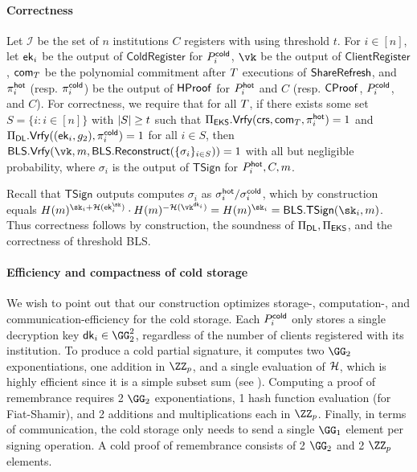 \paragraph{Correctness}
Let $\mathcal{I}$ be the set of $n$ institutions $C$ registers with using threshold $t$. For $i \in [n]$, let $\mathsf{ek}_i$ be the output of $\mathsf{ColdRegister}$ for $P_i^{\mathsf{cold}}$, $\vk$ be the output of $\mathsf{ClientRegister}$, $\mathsf{com}_{T}$ be the polynomial commitment after $T$ executions of $\mathsf{ShareRefresh}$, and $\pi_i^{\mathsf{hot}}$ (resp. $\pi_i^{\mathsf{cold}}$) be the output of $\mathsf{HProof}$ for $P_i^{\mathsf{hot}}$ and $C$ (resp. $\mathsf{CProof}$, $P_i^{\mathsf{cold}}$, and $C$).
For correctness, we require that for all $T$, if there exists some set $S = \{i: i \in [n]\}$ with $\lvert S \rvert \geq t$ such that $\Pi_{\sf EKS}.\mathsf{Vrfy}(\mathsf{crs}, \mathsf{com}_{T},\allowbreak \pi_i^{\mathsf{hot}}) = 1$ and $\Pi_{\sf DL}.\mathsf{Vrfy}((\mathsf{ek}_i, g_2), \pi_i^{\mathsf{cold}}) = 1$ for all $i \in S$,
then $\mathsf{BLS}.\vrfy(\vk,\allowbreak m, \mathsf{BLS}.\recon(\{\sigma_i\}_{i \in S})) = 1$ with all but negligible probability, where $\sigma_i$ is the output of $\mathsf{TSign}$ for $P_i^{\mathsf{hot}}, C, m$.

Recall that $\mathsf{TSign}$ outputs computes $\sigma_i$ as $\sigma_i^{\mathsf{hot}}/\sigma_i^{\mathsf{cold}}$, which by construction equals $\blshash(m)^{\sk_i + \lhlhash(\ek_i^{\sk})} \cdot \blshash(m)^{-\lhlhash(\vk^{\dk_i})} = \blshash(m)^{\sk_i} = \mathsf{BLS}.\mathsf{TSign}(\sk_i, m)$. Thus correctness follows by construction, the soundness of $\Pi_{\sf DL}, \Pi_{\sf EKS}$, and the correctness of threshold BLS.

\paragraph{Efficiency and compactness of cold storage}
We wish to point out that our construction optimizes storage-, computation-, and communication-efficiency for the cold storage. Each $P_i^{\mathsf{cold}}$ only stores a single decryption key $\dk_i \in \GG_2^2$, regardless of the number of clients registered with its institution. To produce a cold partial signature, it computes two $\GG_2$ exponentiations, one addition in $\ZZ_p$, and a single evaluation of $\mathcal{H}$, which is highly efficient since it is a simple subset sum (see ). Computing a proof of remembrance requires 2 $\GG_2$ exponentiations, 1 hash function evaluation (for Fiat-Shamir), and 2 additions and multiplications each in $\ZZ_p$. Finally, in terms of communication, the cold storage only needs to send a single $\GG_1$ element per signing operation. A cold proof of remembrance consists of 2 $\GG_2$ and 2 $\ZZ_p$ elements.